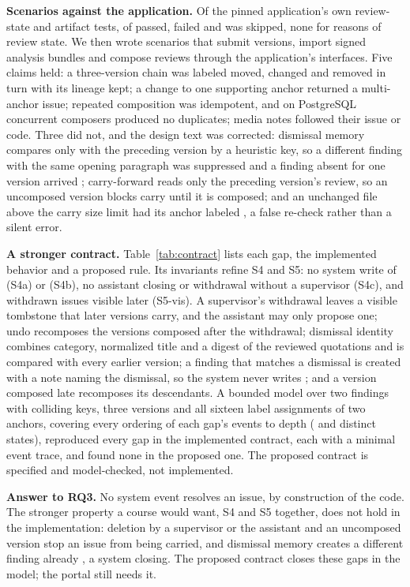 \textbf{Scenarios against the application.} Of the pinned application's own review-state and artifact tests, \wpdAppTestsPassed{} of \wpdAppTestsCollected{} passed, \wpdAppTestsFailed{} failed and \wpdAppTestsSkipped{} was skipped, none for reasons of review state. We then wrote \wpdScenarioRun{} scenarios that submit versions, import signed analysis bundles and compose reviews through the application's interfaces. Five claims held: a three-version chain was labeled moved, changed and removed in turn with its lineage kept; a change to one supporting anchor returned a multi-anchor issue; repeated composition was idempotent, and on PostgreSQL~\wpdPgVersion{} concurrent composers produced no duplicates; media notes followed their issue or code. Three did not, and the design text was corrected: dismissal memory compares only with the preceding version by a heuristic key, so a different finding with the same opening paragraph was suppressed and a finding absent for one version arrived ; carry-forward reads only the preceding version's review, so an uncomposed version blocks carry until it is composed; and an unchanged file above the carry size limit had its anchor labeled , a false re-check rather than a silent error.



\textbf{A stronger contract.} Table~\ref{tab:contract} lists each gap, the implemented behavior and a proposed rule. Its invariants refine S4 and S5: no system write of  (S4a) or  (S4b), no assistant closing or withdrawal without a supervisor (S4c), and withdrawn issues visible later (S5-vis). A supervisor's withdrawal leaves a visible tombstone that later versions carry, and the assistant may only propose one; undo recomposes the versions composed after the withdrawal; dismissal identity combines category, normalized title and a digest of the reviewed quotations and is compared with every earlier version; a finding that matches a dismissal is created  with a note naming the dismissal, so the system never writes ; and a version composed late recomposes its descendants. A bounded model over two findings with colliding keys, three versions and all sixteen label assignments of two anchors, covering every ordering of each gap's events to depth \wcDepth{} (\wcStatesImpl{} and \wcStatesStrong{} distinct states), reproduced every gap in the implemented contract, each with a minimal event trace, and found none in the proposed one. The proposed contract is specified and model-checked, not implemented.

\textbf{Answer to RQ3.} No system event resolves an issue, by construction of the code. The stronger property a course would want, S4 and S5 together, does not hold in the implementation: deletion by a supervisor or the assistant and an uncomposed version stop an issue from being carried, and dismissal memory creates a different finding already , a system closing. The proposed contract closes these gaps in the model; the portal still needs it.
